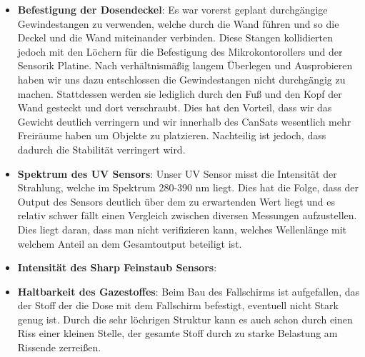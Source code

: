 \begin{itemize}
	\item \textbf{Befestigung der Dosendeckel}: Es war vorerst geplant durchgängige Gewindestangen zu verwenden, welche durch die Wand führen und so die Deckel und die Wand miteinander verbinden. Diese Stangen kollidierten jedoch mit den Löchern für die Befestigung des Mikrokontorollers und der Sensorik Platine. Nach verhältnismäßig langem Überlegen und Ausprobieren haben wir uns dazu entschlossen die Gewindestangen nicht durchgängig zu machen. Stattdessen werden sie lediglich durch den Fuß und den Kopf der Wand gesteckt und dort verschraubt. Dies hat den Vorteil, dass wir das Gewicht deutlich verringern und wir innerhalb des CanSats wesentlich mehr Freiräume haben um Objekte zu platzieren. Nachteilig ist jedoch, dass dadurch die Stabilität verringert wird.
	\item \textbf{Spektrum des UV Sensors}: Unser UV Sensor misst die Intensität der Strahlung, welche im Spektrum 280-390 nm liegt. Dies hat die Folge, dass der Output des Sensors deutlich über dem zu erwartenden Wert liegt und es relativ schwer fällt einen Vergleich zwischen diversen Messungen aufzustellen. Dies liegt daran, dass man nicht verifizieren kann, welches Wellenlänge mit welchem Anteil an dem Gesamtoutput beteiligt ist.
	\item \textbf{Intensität des Sharp Feinstaub Sensors}:
	\item \textbf{Haltbarkeit des Gazestoffes}: Beim Bau des Fallschirms ist aufgefallen, das der Stoff der die Dose mit dem Fallschirm befestigt, eventuell nicht Stark genug ist. Durch die sehr löchrigen Struktur kann es auch schon durch einen Riss einer kleinen Stelle, der gesamte Stoff durch zu starke Belastung am Rissende zerreißen.
\end{itemize}
